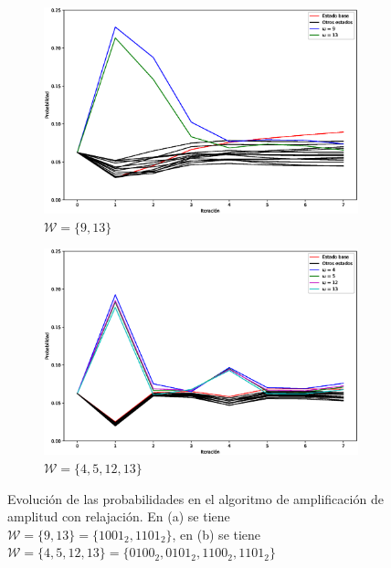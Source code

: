 \documentclass[xetex,mathserif,serif]{beamer}
\begin{document}
\begin{frame}
\begin{figure}[H]
    \centering
    \begin{subfigure}[m]{0.49\textwidth}
        \centering
        \includegraphics[width=0.99\linewidth]{img/grover2loss.eps}
        \caption{$\mathcal{W} = \{9, 13\}$}
    \end{subfigure}
    \begin{subfigure}[m]{0.49\textwidth}
        \centering
        \includegraphics[width=0.99\linewidth]{img/grover3loss.eps}
        \caption{$\mathcal{W} = \{4, 5, 12, 13\}$}
    \end{subfigure}
    \caption[Evolución de las probabilidades en el algoritmo de amplificación de amplitud con relajación]{Evolución de las probabilidades en el algoritmo de amplificación de amplitud con relajación. En (a) se tiene $\mathcal{W} = \{9, 13\} = \{1001_2, 1101_2\}$, en (b) se tiene $\mathcal{W} = \{4, 5, 12, 13\} = \{0100_2, 0101_2, 1100_2, 1101_2\}$}
    \label{fig:groverlosscomp2}
\end{figure}

\end{frame}
\end{document}
